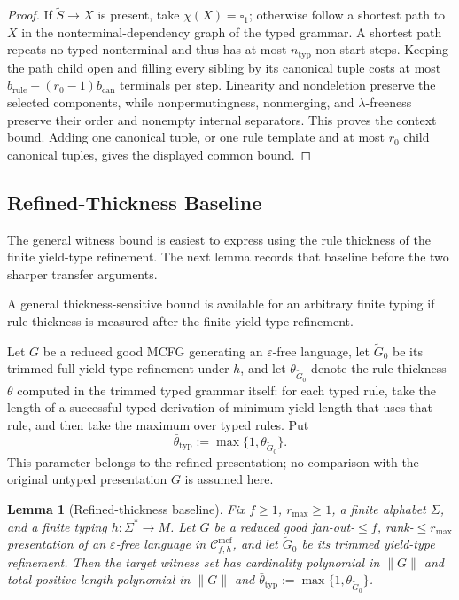 \documentclass[11pt]{article}
\numberwithin{equation}{section}
\theoremstyle{plain}
\newtheorem{lemma}[theorem]{Lemma}
\theoremstyle{definition}
\theoremstyle{remark}
\newcommand{\Cmcf}[2]{\mathcal{C}^{\mathrm{mcf}}_{#1,#2}}
\newcommand{\blank}{\square}
\newcommand{\eps}{\varepsilon}
\begin{document}
\begin{proof}
If $\widetilde S\to X$ is present, take $\chi(X)=\blank_1$; otherwise follow a shortest path to $X$ in the nonterminal-dependency
graph of the typed grammar.  A shortest path repeats no typed nonterminal and thus
has at most $n_{\mathrm{typ}}$ non-start steps.  Keeping the path child open and
filling every sibling by its canonical tuple costs at most
$b_{\mathrm{rule}}+(r_0-1)b_{\mathrm{can}}$ terminals per step.  Linearity and nondeletion preserve the
selected components, while nonpermutingness, nonmerging, and $\lambda$-freeness
preserve their order and nonempty internal separators.  This proves the context
bound.  Adding one canonical tuple, or one rule template and at most $r_0$ child canonical tuples, gives the displayed common bound.
\end{proof}

\subsection{Refined-Thickness Baseline}
\label{subsec:typed-thickness}

The general witness bound is easiest to express using the rule thickness of the
finite yield-type refinement.  The next lemma records that baseline before the
two sharper transfer arguments.

A general thickness-sensitive bound is available for an arbitrary finite
typing if rule thickness is measured after the finite yield-type refinement.

Let $G$ be a reduced good MCFG generating an $\eps$-free language, let $\widetilde G_0$ be its
trimmed full yield-type refinement under $h$, and let
$\theta_{\widetilde G_0}$ denote the rule thickness $\theta$ computed in the
trimmed typed grammar itself: for each typed rule, take the length of
a successful typed derivation of minimum yield length that uses that rule, and then
take the maximum over typed rules.  Put
\[
  \bar\theta_{\mathrm{typ}}
  :=\max\{1,\theta_{\widetilde G_0}\}.
\]
This parameter belongs to the refined presentation; no comparison with
the original untyped presentation $G$ is assumed here.

\begin{lemma}[Refined-thickness baseline]
\label{lem:typed-thickness-baseline}
Fix $f\ge1$, $r_{\max}\ge1$, a finite alphabet $\Sigma$, and a finite
typing $h:\Sigma^*\to M$.  Let $G$ be a reduced good fan-out-$\le f$,
rank-$\le r_{\max}$ presentation of an $\eps$-free language in
$\Cmcf{f}{h}$, and let $\widetilde G_0$ be its trimmed yield-type refinement.
Then the target witness set has cardinality polynomial in $\|G\|$ and total
positive length polynomial in $\|G\|$ and
$\bar\theta_{\mathrm{typ}}:=\max\{1,\theta_{\widetilde G_0}\}$.
\end{lemma}
\end{document}
